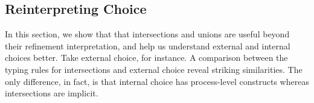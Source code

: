 \documentclass[submission,copyright,creativecommons]{eptcs}
\newcommand\indexVar{k}
\begin{document}


\subsection{Reinterpreting Choice}
\label{reinterpreting-choice}

In this section, we show that that intersections and unions are useful beyond their refinement interpretation, and help us understand external and internal choices better. Take external choice, for instance. A comparison between the typing rules for intersections and external choice reveal striking similarities. The only difference, in fact, is that internal choice has process-level constructs whereas intersections are implicit.
\end{document}
